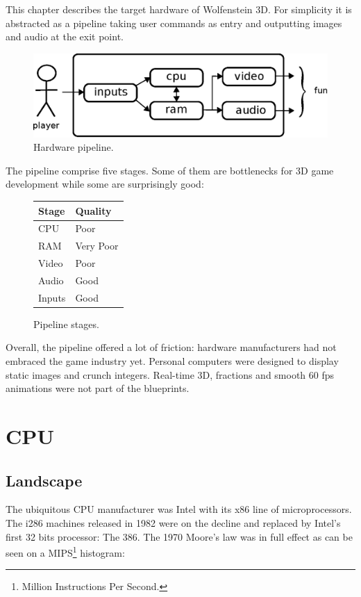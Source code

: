 \documentclass[book.tex]{subfiles}
\begin{document}
This chapter describes the target hardware of Wolfenstein 3D. For simplicity it is abstracted as a pipeline taking user commands as entry and outputting images and audio at the exit point.

\begin{figure}[H]
\centering
\includegraphics[scale=0.7]{imgs/fun_pipeline.eps}
%
\caption{Hardware pipeline.}
\label{fig:digraph}
\end{figure}

The pipeline comprise five stages. Some of them are bottlenecks for 3D game development while some are surprisingly good:

 \bigskip

\begin{figure}[H]
\centering
\begin{tabularx}{\textwidth}{ X X  }
  \toprule
  \textbf{Stage} & \textbf{Quality} \\ \bottomrule
  CPU & Poor \\ 
  RAM & Very Poor \\ 
  Video & Poor \\ 
  Audio & Good \\ 
  Inputs & Good \\ \bottomrule
\end{tabularx}
\caption{Pipeline stages.}  \label{fig:Pipeline stages}
\end{figure}

Overall, the pipeline offered a lot of friction: hardware manufacturers had not embraced the game industry yet. Personal computers were designed to display static images and crunch integers. Real-time 3D, fractions and smooth 60 fps animations were not part of the blueprints.

\section{CPU}
  \subsection{Landscape}
  The ubiquitous CPU manufacturer was Intel with its x86 line of microprocessors.  The i286 machines released in 1982 were on the decline and replaced by Intel's first 32 bits processor: The 386. The 1970 Moore's law was in full effect as can be seen on a MIPS\footnote{Million Instructions Per Second.} histogram:
\end{document}
